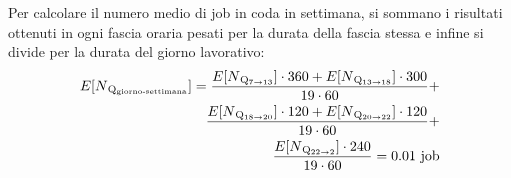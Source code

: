 \documentclass[a4paper, 12pt]{article}
\begin{document}
Per calcolare il numero medio di job in coda in settimana, si sommano i risultati ottenuti
in ogni fascia oraria pesati per la durata della fascia stessa e infine si
divide per la durata del giorno lavorativo:
\[
\begin{aligned}
\begin{split}
  E[N\textsubscript{Q\textsubscript{giorno-settimana}}] = \frac{E[N\textsubscript{Q\textsubscript{7$\rightarrow$13}}] \cdot 360
+ E[N\textsubscript{Q\textsubscript{13$\rightarrow$18}}] \cdot 300}{19 \cdot 60} + \\
\frac{E[N\textsubscript{Q\textsubscript{18$\rightarrow$20}}] \cdot 120
+ E[N\textsubscript{Q\textsubscript{20$\rightarrow$22}}] \cdot 120}{19 \cdot 60} + \\
\frac{E[N\textsubscript{Q\textsubscript{22$\rightarrow$2}}] \cdot 240}{19 \cdot 60} = 0.01 \text{ job} 
\end{split}
\end{aligned}
\]
\end{document}
